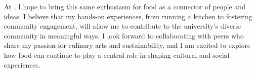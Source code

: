 
At \GetUniversityName, I hope to bring this same enthusiasm for food as a connector of people and ideas. I believe that my hands-on experiences, from running a kitchen to fostering community engagement, will allow me to contribute to the university's diverse community in meaningful ways. I look forward to collaborating with peers who share my passion for culinary arts and sustainability, and I am excited to explore how food can continue to play a central role in shaping cultural and social experiences.

